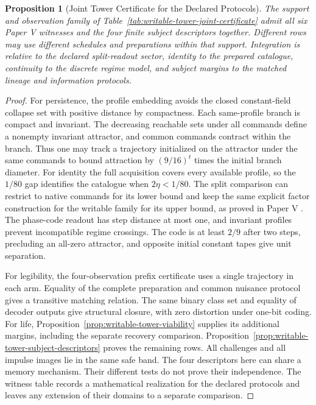 \documentclass[11pt,a4paper]{article}
\newtheorem{proposition}{Proposition}[section]
\theoremstyle{definition}
\begin{document}
\begin{proposition}[Joint Tower Certificate for the Declared Protocols]\label{prop:writable-tower-joint-certificate}
The support and observation family of Table~\ref{tab:writable-tower-joint-certificate} admit all six Paper V witnesses and the four finite subject descriptors together. Different rows may use different schedules and preparations within that support. Integration is relative to the declared split-readout sector, identity to the prepared catalogue, continuity to the discrete regime model, and subject margins to the matched lineage and information protocols.
\end{proposition}
\begin{proof}
For persistence, the profile embedding avoids the closed constant-field collapse set with positive distance by compactness. Each same-profile branch is compact and invariant. The decreasing reachable sets under all commands define a nonempty invariant attractor, and common commands contract within the branch. Thus one may track a trajectory initialized on the attractor under the same commands to bound attraction by $(9/16)^t$ times the initial branch diameter. For identity the full acquisition covers every available profile, so the $1/80$ gap identifies the catalogue when $2\eta<1/80$. The split comparison can restrict to native commands for its lower bound and keep the same explicit factor construction for the writable family for its upper bound, as proved in Paper V \cite{paper5}. The phase-code readout has step distance at most one, and invariant profiles prevent incompatible regime crossings. The code is at least $2/9$ after two steps, precluding an all-zero attractor, and opposite initial constant tapes give unit separation.

For legibility, the four-observation prefix certificate uses a single trajectory in each arm. Equality of the complete preparation and common nuisance protocol gives a transitive matching relation. The same binary class set and equality of decoder outputs give structural closure, with zero distortion under one-bit coding. For life, Proposition~\ref{prop:writable-tower-viability} supplies its additional margins, including the separate recovery comparison. Proposition~\ref{prop:writable-tower-subject-descriptors} proves the remaining rows. All challenges and all impulse images lie in the same safe band. The four descriptors here can share a memory mechanism. Their different tests do not prove their independence. The witness table records a mathematical realization for the declared protocols and leaves any extension of their domains to a separate comparison.
\end{proof}
\end{document}
